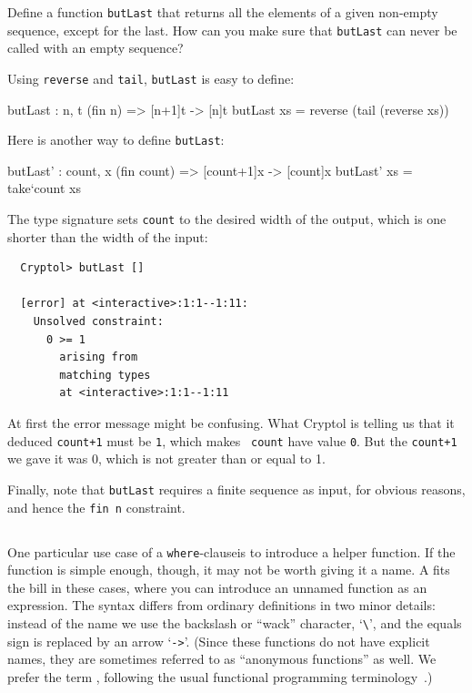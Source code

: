 \begin{Exercise}\label{ex:fn:3}
  Define a function {\tt butLast} that returns all the elements of a
  given non-empty sequence, except for the last.  How can you make
  sure that {\tt butLast} can never be called with an empty sequence?
  \indReverse\indTail\indWidth
\end{Exercise}
\begin{Answer}
  Using {\tt reverse} and {\tt tail}, {\tt butLast} is easy to
  define:\indReverse\indTail\indWidth
\begin{code}
  butLast : {n, t} (fin n) => [n+1]t -> [n]t
  butLast xs = reverse (tail (reverse xs))
\end{code}
Here is another way to define {\tt butLast}:
\begin{code}
  butLast' : {count, x} (fin count) => [count+1]x -> [count]x
  butLast' xs = take`{count} xs
\end{code}
The type signature sets {\tt count} to the desired width of the
output, which is one shorter than the width of the input:\indSignature
\begin{Verbatim}
  Cryptol> butLast []

  [error] at <interactive>:1:1--1:11:
    Unsolved constraint:
      0 >= 1
        arising from
        matching types
        at <interactive>:1:1--1:11
\end{Verbatim}
At first the error message might be confusing. What Cryptol is telling
us that it deduced {\tt count+1} must be {\tt 1}, which makes {\tt
  count} have value {\tt 0}.  But the {\tt count+1} we gave it was 0,
which is not greater than or equal to 1.

Finally, note that {\tt butLast} requires a finite sequence as input,
for obvious reasons, and hence the {\tt fin n} constraint.
\end{Answer}

\subsection{\texorpdfstring{\lamexs}{Lambda-expressions}}\label{sec:lamex}

One particular use case of a {\tt where}-clause\indWhere is to
introduce a helper function. If the function is simple enough, though,
it may not be worth giving it a name. A \lamex fits the bill in these
cases, where you can introduce an unnamed function as an
expression. The syntax differs from ordinary definitions in two minor
details: instead of the name we use the backslash or ``wack''
character, `{\tt \Verb|\|}', and the equals sign is replaced by an
arrow `{\tt ->}'.  (Since these functions do not have explicit names,
they are sometimes referred to as ``anonymous functions'' as well. We
prefer the term \lamex, following the usual functional programming
terminology~\cite{Has98}.)

